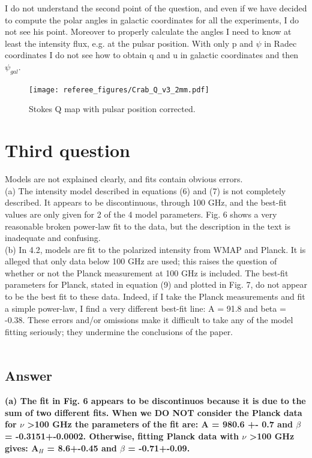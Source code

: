 \documentclass[report,twocolumn]{aa}
\begin{document}
{\color{blue}I do not understand the second point of the question, and even if we have decided to compute the polar angles in galactic coordinates for all the experiments, I do not see his point. Moreover to properly calculate the angles I need to know at least the intensity flux, e.g. at the pulsar position. With only p and $\psi$ in Radec coordinates I do not see how to obtain q and u in galactic coordinates and then $\psi_{gal}$.}

\begin{figure}[!h]
\centering
     	  { \texttt{[image: referee\_figures/Crab\_Q\_v3\_2mm.pdf]}}
\caption{Stokes Q map with pulsar position corrected.}     	  
 
\label{Q_map}
\end{figure}




\section{Third question}
Models are not explained clearly, and fits contain obvious errors.\\
(a) The intensity model described in equations (6) and (7) is not
completely described. It appears to be discontinuous, through 100
GHz, and the best-fit values are only given for 2 of the 4 model
parameters. Fig. 6 shows a very reasonable broken power-law fit to
the data, but the description in the text is inadequate and confusing.\\
(b) In 4.2, models are fit to the polarized intensity from WMAP and
Planck. It is alleged that only data below 100 GHz are used; this
raises the question of whether or not the Planck measurement at 100
GHz is included. The best-fit parameters for Planck, stated in
equation (9) and plotted in Fig. 7, do not appear to be the best fit
to these data. Indeed, if I take the Planck measurements and fit a
simple power-law, I find a very different best-fit line: A = 91.8 and
beta = -0.38.
These errors and/or omissions make it difficult to take any of the
model fitting seriously; they undermine the conclusions of the paper.
\\ \\
\subsection{\textbf{Answer}}
\textbf{(a)  The fit in Fig. 6 appears to be discontinuos because it is due to the sum of two different fits. When we DO NOT consider the Planck data for $\nu$ \textgreater 100 GHz the parameters of the fit are: A = 980.6 +- 0.7 and $\beta$ = -0.3151+-0.0002.
Otherwise, fitting Planck data with $\nu$ \textgreater 100 GHz gives: A$_H$ = 8.6+-0.45 and $\beta$ = -0.71+-0.09.}
\end{document}
